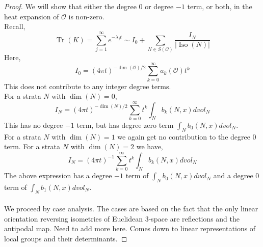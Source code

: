 \documentclass[12pt]{article}
\newcommand{\myabs}[1]{\vert#1\vert}
\theoremstyle{definition}
\DeclareMathOperator{\iso}{Iso}
\DeclareMathOperator{\trace}{Tr}
\begin{document}
\begin{proof}
    We will show that either the degree $0$ or degree $-1$ term, or both, in the heat expansion of $\mathcal{O}$ is non-zero.\\
Recall,
    \begin{equation*}
    \trace(K) = \sum_{j=1}^{\infty}e^{-\lambda_{j} t}\sim I_0+\sum_{N \in S(\mathcal{O})}\frac{I_N}{\myabs{\iso(N)}}
    \end{equation*}
Here,
\begin{equation*}
    I_0 = {(4\pi t)}^{-\dim(\mathcal{O})/2}\sum_{k=0}^{\infty}a_k(\mathcal{O})t^k
\end{equation*}
This does not contribute to any integer degree terms.\\
For a strata $N$ with $\dim(N) = 0$,
\begin{equation*}
    I_N = {(4\pi t)}^{-\dim(N)/2}\sum_{k=0}^{\infty}t^k\int_{N}b_k(N,x)dvol_N
\end{equation*}
This has no degree $-1$ term, but has degree zero term $\int_{N}b_0(N,x)dvol_N$.\\
For a strata $N$ with $\dim(N) = 1$ we again get no contribution to the degree $0$ term.
For a strata $N$ with $\dim(N) = 2$ we have,
\begin{equation*}
    I_N = {(4\pi t)}^{-1}\sum_{k=0}^{\infty}t^k\int_{N}b_k(N,x)dvol_N
\end{equation*}
The above expression has a degree $-1$ term of $\int_{N}b_0(N,x)dvol_N$ and a degree $0$ term of $\int_{N}b_1(N,x)dvol_N$.\\\\

We proceed by case analysis.  The cases are based on the fact that the only linear orientation reversing isometries of Euclidean 3-space are reflections and the antipodal map.  Need to add more here.  Comes down to linear representations of local groups and their determinants.


\end{proof}
\end{document}

